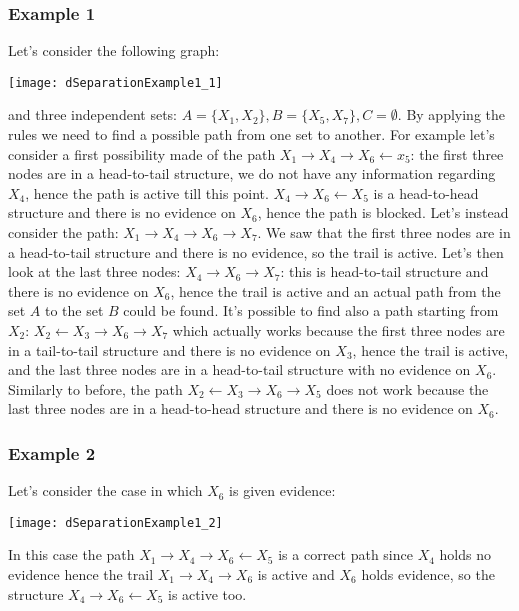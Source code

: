 \subsubsection{Example 1}
Let's consider the following graph:
\begin{center}
  \texttt{[image: dSeparationExample1\_1]}
\end{center}
and three independent sets: $A=\{X_1,X_2\}, B=\{X_5,X_7\}, C=\emptyset$. By applying the rules we need to find a possible path from one set to another. For example let's consider a first possibility made of the path $X_1\rightarrow X_4\rightarrow X_6\leftarrow x_5$: the first three nodes are in a head-to-tail structure, we do not have any information regarding $X_4$, hence the path is active till this point. $X_4\rightarrow X_6\leftarrow X_5$ is a head-to-head structure and there is no evidence on $X_6$, hence the path is blocked. \newline
Let's instead consider the path: $X_1\rightarrow X_4\rightarrow X_6\rightarrow X_7$. We saw that the first three nodes are in a head-to-tail structure and there is no evidence, so the trail is active. Let's then look at the last three nodes: $X_4\rightarrow X_6\rightarrow X_7$: this is head-to-tail structure and there is no evidence on $X_6$, hence the trail is active and an actual path from the set $A$ to the set $B$ could be found. \newline
It's possible to find also a path starting from $X_2$: $X_2\leftarrow X_3\rightarrow X_6 \rightarrow X_7$ which actually works because the first three nodes are in a tail-to-tail structure and there is no evidence on $X_3$, hence the trail is active, and the last three nodes are in a head-to-tail structure with no evidence on $X_6$. \newline
Similarly to before, the path $X_2\leftarrow X_3\rightarrow X_6\rightarrow X_5$ does not work because the last three nodes are in a head-to-head structure and there is no evidence on $X_6$.
%
\subsubsection{Example 2}
Let's consider the case in which $X_6$ is given evidence:
\begin{center}
  \texttt{[image: dSeparationExample1\_2]}
\end{center}
In this case the path $X_1\rightarrow X_4\rightarrow X_6 \leftarrow X_5$ is a correct path since $X_4$ holds no evidence hence the trail $X_1\rightarrow X_4\rightarrow X_6$ is active and $X_6$ holds evidence, so the structure $X_4\rightarrow X_6\leftarrow X_5$ is active too. 
%
